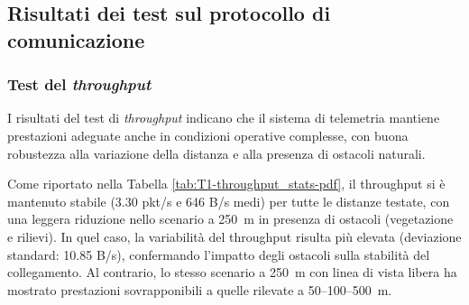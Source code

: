 \documentclass[12pt,a4paper,twoside]{book}
\begin{document}
\subsection{Risultati dei test sul protocollo di comunicazione}
\subsubsection{Test del \emph{throughput}}
I risultati del test di \emph{throughput} indicano che il sistema di telemetria
mantiene prestazioni adeguate anche in condizioni operative complesse, con buona
robustezza alla variazione della distanza e alla presenza di ostacoli naturali.

Come riportato nella Tabella \ref{tab:T1-throughput_stats-pdf}, il throughput si è
mantenuto stabile (3.30 pkt/s e 646 B/s medi) per tutte le distanze testate, con
una leggera riduzione nello scenario a 250~m in presenza di ostacoli (vegetazione
e rilievi). In quel caso, la variabilità del throughput risulta più elevata
(deviazione standard: 10.85 B/s), confermando l'impatto degli ostacoli sulla
stabilità del collegamento. Al contrario, lo stesso scenario a 250~m con linea
di vista libera ha mostrato prestazioni sovrapponibili a quelle rilevate a 50–100–500~m.
\end{document}
